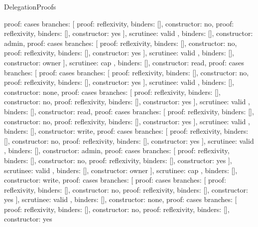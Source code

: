\begin{lexlean}{DelegationProofs}
\begin{semanticmodule}
{{{{          {proof: cases{
            branches: [
              {proof: reflexivity{}, binders: [], constructor: no},
              {proof: reflexivity{}, binders: [], constructor: yes}
            ],
            scrutinee: valid
          }, binders: [], constructor: admin},
          {proof: cases{
            branches: [
              {proof: reflexivity{}, binders: [], constructor: no},
              {proof: reflexivity{}, binders: [], constructor: yes}
            ],
            scrutinee: valid
          }, binders: [], constructor: owner}
        ],
        scrutinee: cap
      }, binders: [], constructor: read},
      {proof: cases{
        branches: [
          {proof: cases{
            branches: [
              {proof: reflexivity{}, binders: [], constructor: no},
              {proof: reflexivity{}, binders: [], constructor: yes}
            ],
            scrutinee: valid
          }, binders: [], constructor: none},
          {proof: cases{
            branches: [
              {proof: reflexivity{}, binders: [], constructor: no},
              {proof: reflexivity{}, binders: [], constructor: yes}
            ],
            scrutinee: valid
          }, binders: [], constructor: read},
          {proof: cases{
            branches: [
              {proof: reflexivity{}, binders: [], constructor: no},
              {proof: reflexivity{}, binders: [], constructor: yes}
            ],
            scrutinee: valid
          }, binders: [], constructor: write},
          {proof: cases{
            branches: [
              {proof: reflexivity{}, binders: [], constructor: no},
              {proof: reflexivity{}, binders: [], constructor: yes}
            ],
            scrutinee: valid
          }, binders: [], constructor: admin},
          {proof: cases{
            branches: [
              {proof: reflexivity{}, binders: [], constructor: no},
              {proof: reflexivity{}, binders: [], constructor: yes}
            ],
            scrutinee: valid
          }, binders: [], constructor: owner}
        ],
        scrutinee: cap
      }, binders: [], constructor: write},
      {proof: cases{
        branches: [
          {proof: cases{
            branches: [
              {proof: reflexivity{}, binders: [], constructor: no},
              {proof: reflexivity{}, binders: [], constructor: yes}
            ],
            scrutinee: valid
          }, binders: [], constructor: none},
          {proof: cases{
            branches: [
              {proof: reflexivity{}, binders: [], constructor: no},
              {proof: reflexivity{}, binders: [], constructor: yes}
}}}}}}
\end{semanticmodule}
\end{lexlean}

